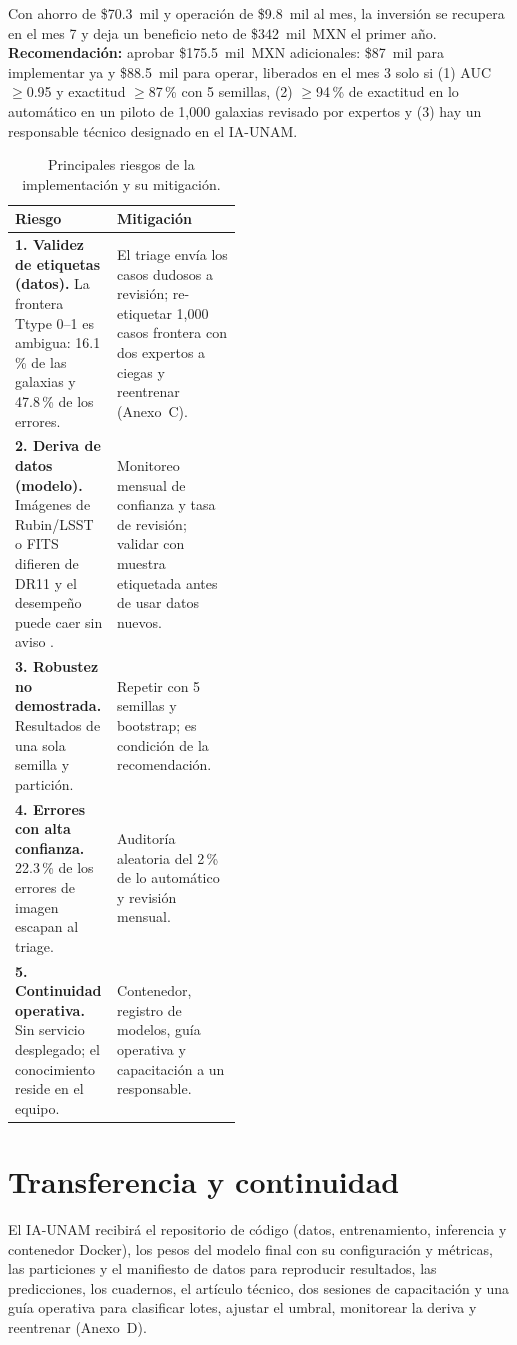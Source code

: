 \documentclass[letterpaper,11pt]{article}
\begin{document}
Con ahorro de \$70.3~mil y operación de \$9.8~mil al mes, la inversión se recupera en el mes 7 y deja un beneficio neto de \$342~mil~MXN el primer año. \textbf{Recomendación:} aprobar \$175.5~mil~MXN adicionales: \$87~mil para implementar ya y \$88.5~mil para operar, liberados en el mes 3 solo si (1) AUC $\geq$0.95 y exactitud $\geq$87\,\% con 5 semillas, (2) $\geq$94\,\% de exactitud en lo automático en un piloto de 1,000 galaxias revisado por expertos y (3) hay un responsable técnico designado en el IA-UNAM.

\begin{table}[H]
\centering\footnotesize{}
\caption{Principales riesgos de la implementación y su mitigación.}
\label{tab:riesgos}
\vspace{-4pt}
\begin{tabularx}{\linewidth}{@{}>{\raggedright\arraybackslash}p{0.45\linewidth}Y@{}}
\toprule
\textbf{Riesgo} & \textbf{Mitigación}\\
\midrule
\textbf{1. Validez de etiquetas (datos).} La frontera Ttype 0--1 es ambigua: 16.1\,\% de las galaxias y 47.8\,\% de los errores. & El triage envía los casos dudosos a revisión; re-etiquetar 1,000 casos frontera con dos expertos a ciegas y reentrenar (Anexo~C).\\[2pt]
\textbf{2. Deriva de datos (modelo).} Imágenes de Rubin/LSST o FITS difieren de DR11 y el desempeño puede caer sin aviso \parencite{babic2021}. & Monitoreo mensual de confianza y tasa de revisión; validar con muestra etiquetada antes de usar datos nuevos.\\[2pt]
\textbf{3. Robustez no demostrada.} Resultados de una sola semilla y partición. & Repetir con 5 semillas y bootstrap; es condición de la recomendación.\\[2pt]
\textbf{4. Errores con alta confianza.} 22.3\,\% de los errores de imagen escapan al triage. & Auditoría aleatoria del 2\,\% de lo automático y revisión mensual.\\[2pt]
\textbf{5. Continuidad operativa.} Sin servicio desplegado; el conocimiento reside en el equipo. & Contenedor, registro de modelos, guía operativa y capacitación a un responsable.\\
\bottomrule
\end{tabularx}
\end{table}

\vspace{-14pt}
\section*{Transferencia y continuidad}
\vspace{-6pt}
El IA-UNAM recibirá el repositorio de código (datos, entrenamiento, inferencia y contenedor Docker), los pesos del modelo final con su configuración y métricas, las particiones y el manifiesto de datos para reproducir resultados, las predicciones, los cuadernos, el artículo técnico, dos sesiones de capacitación y una guía operativa para clasificar lotes, ajustar el umbral, monitorear la deriva y reentrenar (Anexo~D).
\end{document}
